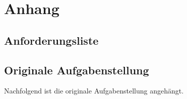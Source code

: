 \newpage
\section*{Anhang}

\subsection*{Anforderungsliste}


\subsection*{Originale Aufgabenstellung}

Nachfolgend ist die originale Aufgabenstellung angehängt.


